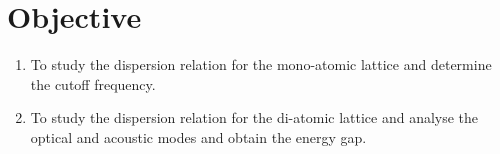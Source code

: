\section{Objective}

\begin{enumerate}
    \item To study the dispersion relation for the mono-atomic lattice and determine the cutoff frequency.
    \item To study the dispersion relation for the di-atomic lattice and analyse the optical
    and acoustic modes and obtain the energy gap.
\end{enumerate}
